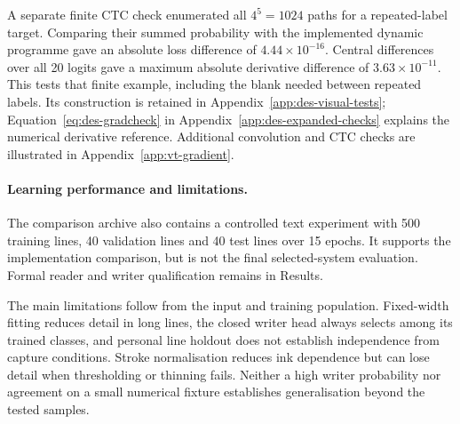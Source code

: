 A separate finite CTC check enumerated all $4^5=1024$ paths for a repeated-label target. Comparing their summed probability with the implemented dynamic programme gave an absolute loss difference of $4.44\times10^{-16}$. Central differences over all 20 logits gave a maximum absolute derivative difference of $3.63\times10^{-11}$. This tests that finite example, including the blank needed between repeated labels. Its construction is retained in Appendix~\ref{app:des-visual-tests}; Equation~\ref{eq:des-gradcheck} in Appendix~\ref{app:des-expanded-checks} explains the numerical derivative reference. Additional convolution and CTC checks are illustrated in Appendix~\ref{app:vt-gradient}.

\paragraph{Learning performance and limitations.}
The comparison archive also contains a controlled text experiment with 500 training lines, 40 validation lines and 40 test lines over 15 epochs. It supports the implementation comparison, but is not the final selected-system evaluation. Formal reader and writer qualification remains in Results.

The main limitations follow from the input and training population. Fixed-width fitting reduces detail in long lines, the closed writer head always selects among its trained classes, and personal line holdout does not establish independence from capture conditions. Stroke normalisation reduces ink dependence but can lose detail when thresholding or thinning fails. Neither a high writer probability nor agreement on a small numerical fixture establishes generalisation beyond the tested samples.
\FloatBarrier
